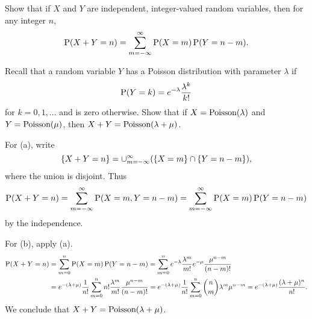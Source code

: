 \documentclass[a4paper, 12pt]{article}
\begin{document}
\begin{exercise}{2.6}\hspace{1em}\vspace{-1.5em}
    \begin{thmenum}
        \item Show that if $X$ and $Y$ are independent, integer-valued random variables, 
        then for any integer $n$, 
        \begin{equation*}
            \P(X + Y = n) = \sum_{m=-\infty}^{\infty} \P(X = m)\P(Y = n - m).  
        \end{equation*}
        \item Recall that a random variable $Y$ has a Poisson distribution with 
        parameter $\lambda$ if 
        \begin{equation*}
            \P(Y = k) = e^{-\lambda}\frac{\lambda^k}{k!}
        \end{equation*}
        for $k = 0,1,\ldots$ and is zero otherwise. Show that if $X = \Poisson(\lambda)$ 
        and $Y = \Poisson(\mu)$, then $X + Y = \Poisson(\lambda + \mu)$. 
    \end{thmenum}
\end{exercise}
\begin{solution}
    For (a), write 
    \begin{equation*}
        \set{X + Y = n} = \cup_{m=-\infty}^\infty(\set{X = m}\cap\set{Y = n - m}), 
    \end{equation*}
    where the union is disjoint. Thus 
    \begin{equation*}
        \P(X + Y = n) = \sum_{m=-\infty}^\infty\P(X = m, Y = n - m) 
        = \sum_{m=-\infty}^\infty\P(X = m)\P(Y = n - m)
    \end{equation*}
    by the independence. 

    For (b), apply (a). 
    \begin{equation*}
        \begin{split}
            \P(X + Y = n) &= \sum_{m=0}^n\P(X = m)\P(Y = n-m) 
            = \sum_{m=0}^n e^{-\lambda}\frac{\lambda^m}{m!}e^{-\mu}\frac{\mu^{n-m}}{(n-m)!} \\ 
            &= e^{-(\lambda + \mu)}\frac{1}{n!}\sum_{m=0}^n n!\frac{\lambda^m}{m!}\frac{\mu^{n-m}}{(n-m)!} 
            = e^{-(\lambda + \mu)}\frac{1}{n!}\sum_{m=0}^n \binom{n}{m}\lambda^m\mu^{n-m} 
            = e^{-(\lambda + \mu)}\frac{(\lambda + \mu)^n}{n!}. 
        \end{split}
    \end{equation*}
    We conclude that $X+Y = \Poisson(\lambda + \mu)$. 
\end{solution}
\end{document}
